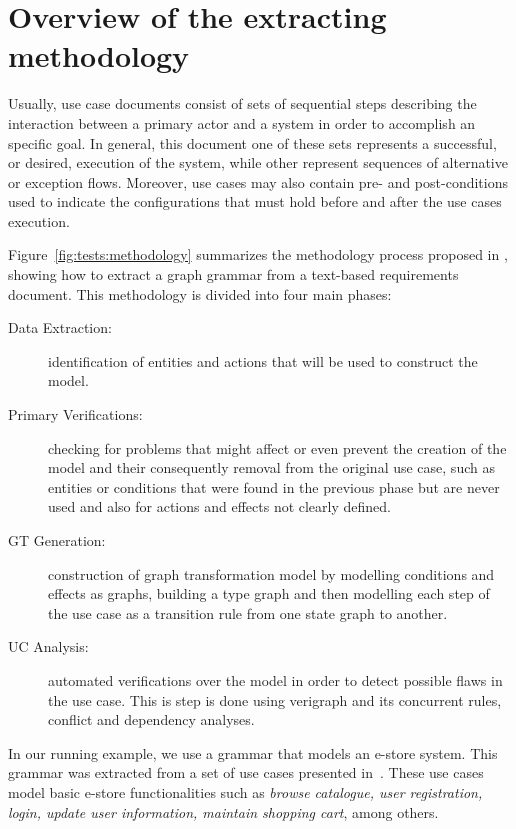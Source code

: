 \section{Overview of the extracting methodology}

Usually, use case documents consist of sets of sequential steps describing the interaction between a primary actor and a system in order to accomplish an specific goal. In general, this document one of these sets represents a successful, or desired, execution of the system, while other represent sequences of alternative or exception flows. Moreover, use cases may also contain pre- and post-conditions used to indicate the configurations that must hold before and after the use cases execution.

Figure~\ref{fig:tests:methodology} summarizes the methodology process proposed in \cite{Junior2015}, showing how to extract a graph grammar from a text-based requirements document. This methodology is divided into four main phases:

\begin{description}
  \item[Data Extraction:] identification of entities and actions that will be used to construct the model.

  \item[Primary Verifications:] checking for problems that might affect or even prevent the creation of the model and their consequently removal from the original use case, such as entities or conditions that were found in the previous phase but are never used and also for actions and effects not clearly defined.

  \item[GT Generation:] construction of graph transformation model by modelling conditions and effects as graphs, building a type graph and then modelling each step of the use case as a transition rule from one state graph to another.

  \item[UC Analysis:] automated verifications over the model in order to detect possible flaws in the use case. This is step is done using verigraph and its concurrent rules, conflict and dependency analyses.
\end{description}

In our running example, we use a grammar that models an e-store system. This grammar was extracted from a set of use cases presented in~\cite{Goins2007}. These use cases model basic e-store functionalities such as \emph{browse catalogue, user registration, login, update user information, maintain shopping cart}, among others. 

